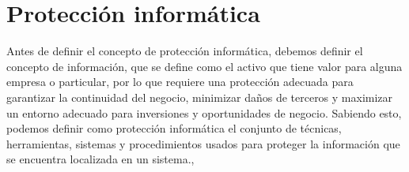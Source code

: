 \chapter{Protección informática}
\label{cha:proteccion-informatica}
Antes de definir el concepto de protección informática, debemos definir el concepto de información, que se define como el activo que tiene valor para alguna empresa o particular, por lo que requiere una protección adecuada para garantizar la continuidad del negocio, minimizar daños de terceros y maximizar un entorno adecuado para inversiones y oportunidades de negocio. Sabiendo esto, podemos definir como protección informática el conjunto de técnicas, herramientas, sistemas y procedimientos usados para proteger la información que se encuentra localizada en un sistema.\cite{info},\cite{proteccion} 
